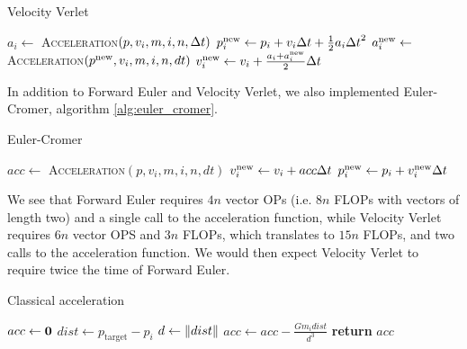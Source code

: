 \documentclass[a4paper]{article}
\begin{document}
\begin{algorithm}
\caption{Velocity Verlet} \label{alg:velocity_verlet}
\begin{algorithmic}[1]
        \State $a_{i} \gets $ \textsc{Acceleration}$(p, v_{i}, m, i, n, {\Delta t})$
        \State $p^{\mathrm{new}}_{i} \gets p_{i} + v_{i} {\Delta t} + \frac{1}{2} a_{i} {\Delta t}^2$
    \EndFor
        \State $a^{\mathrm{new}}_{i} \gets $ \textsc{Acceleration}$(p^{\mathrm{new}}, v_{i}, m, i, n, dt)$
        \State $v^{\mathrm{new}}_{i} \gets v_{i} + \frac{a_{i} + a^{\mathrm{new}}_{i}}{2} {\Delta t}$
    \EndFor
  \EndProcedure
\end{algorithmic}
\end{algorithm}

In addition to Forward Euler and Velocity Verlet, we also implemented Euler-Cromer, algorithm \vref{alg:euler_cromer}.
\begin{algorithm}
\caption{Euler-Cromer} \label{alg:euler_cromer}
\begin{algorithmic}[1]
        \State $acc \gets $ \textsc{Acceleration}$(p, v_{i}, m, i, n, dt)$
        \State $v^{\mathrm{new}}_{i} \gets v_{i} + acc {\Delta t}$
        \State $p^{\mathrm{new}}_{i} \gets p_{i} + v^{\mathrm{new}}_{i} {\Delta t}$
    \EndFor
  \EndProcedure
\end{algorithmic}
\end{algorithm}

We see that Forward Euler requires $4n$ vector OPs (i.e. $8n$ FLOPs with vectors of length two) and a single call to the acceleration function, while Velocity Verlet requires $6n$ vector OPS and $3n$ FLOPs, which translates to $15n$ FLOPs, and two calls to the acceleration function. We would then expect Velocity Verlet to require twice the time of Forward Euler.


\begin{algorithm}
\caption{Classical acceleration} \label{alg:acceleration_classical}
\begin{algorithmic}[1]
    \Statex {}
    \State $acc \gets \bf{0}$ 
            \State $dist \gets p_{\mathrm{target}} - p_{i}$
            \State $d \gets \norm{dist}$ 
            \State $acc \gets acc - \frac{G m_{i} dist}{d^3}$
        \EndIf
    \EndFor
    \State \textbf{return} $acc$
  \EndFunction
\end{algorithmic}
\end{algorithm}
\end{document}
